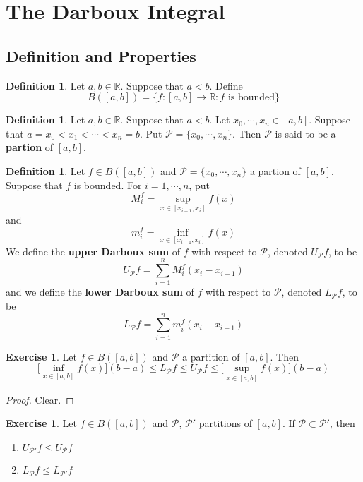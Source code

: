 \documentclass[12pt]{amsart}
\theoremstyle{definition}
\newtheorem{defn}[definition]{Definition}
\newtheorem{ex}[definition]{Exercise}
\newcommand{\R}{\mathbb{R}}
\newcommand{\MP}{\mathcal{P}}
\newcommand{\lex}[1]{\label{ex:#1}}
\newcommand{\ld}[1]{\label{defn:#1}}
\begin{document}
	\newpage
	
	
	
	
	
	
	
	
	\section{The Darboux Integral}
	
	\subsection{Definition and Properties}
	\begin{defn} \ld{00000} 
		Let $a,b \in \R$. Suppose that $a<b$. Define $$B([a,b]) = \{f:[a,b] \rightarrow \R: f\text{ is bounded}\}$$
	\end{defn}
	
	\begin{defn} \ld{00000} 
		Let $a,b \in \R$. Suppose that $a<b$. Let $x_0, \cdots, x_n \in [a,b]$. Suppose that $a= x_0 < x_1 < \cdots < x_n = b$. Put $\MP = \{x_0, \cdots, x_n\}$. Then $\MP$ is said to be a \textbf{partion} of $[a,b]$. 
	\end{defn}
	
	\begin{defn} \ld{00000} 
		Let $f \in B([a,b])$ and $\MP = \{x_0, \cdots, x_n\}$ a partion of $[a,b]$. Suppose that $f$ is bounded. For $i = 1, \cdots, n$, put 
		$$M^f_i = \sup_{x \in [x_{i-1}, x_i]} f(x)$$ and 
		$$m^f_i = \inf_{x \in [x_{i-1}, x_i]} f(x)$$ 
		We define the \textbf{upper Darboux sum} of $f$ with respect to $\MP$, denoted $U_\MP f$, to be $$U_\MP f = \sum_{i=1}^n M^f_i (x_i - x_{i-1})$$ 
		and we define the \textbf{lower Darboux sum} of $f$ with respect to $\MP$, denoted $L_\MP f$, to be
		$$L_\MP f = \sum_{i=1}^n m^f_i (x_i - x_{i-1})$$ 
	\end{defn}

	\begin{ex} \lex{00000} 
		Let $f \in B([a,b])$ and $\MP$ a partition of $[a,b]$. Then $$\bigg[\inf_{x \in [a,b]} f(x) \bigg] (b-a) \leq L_\MP f \leq U_\MP f \leq \bigg[ \sup_{x \in [a,b]} f(x)  \bigg] (b-a)$$
	\end{ex}

	\begin{proof}
		Clear.
	\end{proof}

	\begin{ex} \lex{00000} 
			Let $f \in B([a,b])$ and $\MP$, $\MP'$ partitions of $[a,b]$. If $\MP \subset \MP'$, then 
			\begin{enumerate}
				\item $U_{\MP'} f \leq U_{\MP} f$
				\item $L_{\MP} f \leq L_{\MP'} f$
			\end{enumerate}
	\end{ex}
\end{document}
